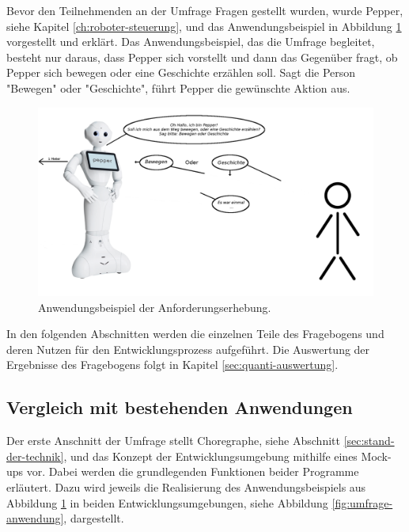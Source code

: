 Bevor den Teilnehmenden an der Umfrage Fragen gestellt wurden, wurde Pepper, siehe Kapitel \ref{ch:roboter-steuerung}, und das Anwendungsbeispiel in Abbildung \ref{fig:umfrage-anwendungsbeispiel} vorgestellt und erklärt. Das Anwendungsbeispiel, das die Umfrage begleitet, besteht nur daraus, dass Pepper sich vorstellt und dann das Gegenüber fragt, ob Pepper sich bewegen oder eine Geschichte erzählen soll. Sagt die Person "Bewegen" oder "Geschichte", führt Pepper die gewünschte Aktion aus.

\begin{figure}[t]
	\centering
	\includegraphics[width=13cm]{Plots/umfrage-anwendungsbeispiel.png}
	\caption{Anwendungsbeispiel der Anforderungserhebung.}
	\label{fig:umfrage-anwendungsbeispiel}
\end{figure}


In den folgenden Abschnitten werden die einzelnen Teile des Fragebogens und deren Nutzen für den Entwicklungsprozess aufgeführt. Die Auswertung der Ergebnisse des Fragebogens folgt in Kapitel \ref{sec:quanti-auswertung}.

\subsection{Vergleich mit bestehenden Anwendungen}
Der erste Anschnitt der Umfrage stellt Choregraphe, siehe Abschnitt \ref{sec:stand-der-technik}, und das Konzept der Entwicklungsumgebung mithilfe eines Mock-ups vor. Dabei werden die grundlegenden Funktionen beider Programme erläutert. Dazu wird jeweils die Realisierung des Anwendungsbeispiels aus Abbildung \ref{fig:umfrage-anwendungsbeispiel} in beiden Entwicklungsumgebungen, siehe Abbildung \ref{fig:umfrage-anwendung}, dargestellt.

